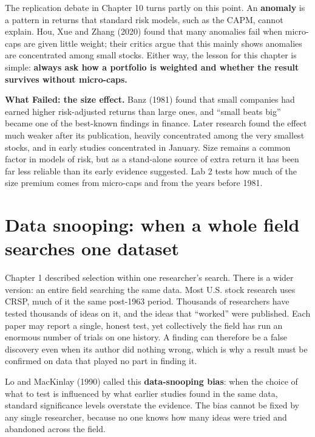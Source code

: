 The replication debate in Chapter 10 turns partly on this point. An \textbf{anomaly} is a pattern in returns that standard risk models, such as the CAPM, cannot explain. Hou, Xue and Zhang (2020) found that many anomalies fail when micro-caps are given little weight; their critics argue that this mainly shows anomalies are concentrated among small stocks. Either way, the lesson for this chapter is simple: \textbf{always ask how a portfolio is weighted and whether the result survives without micro-caps.}

\begin{callout}
\textbf{What Failed: the size effect.} Banz (1981) found that small companies had earned higher risk-adjusted returns than large ones, and ``small beats big'' became one of the best-known findings in finance. Later research found the effect much weaker after its publication, heavily concentrated among the very smallest stocks, and in early studies concentrated in January. Size remains a common factor in models of risk, but as a stand-alone source of extra return it has been far less reliable than its early evidence suggested. Lab 2 tests how much of the size premium comes from micro-caps and from the years before 1981.
\end{callout}

\section{Data snooping: when a whole field searches one dataset}
\label{sec:02-snooping}

Chapter 1 described selection within one researcher's search. There is a wider version: an entire field searching the same data. Most U.S. stock research uses CRSP, much of it the same post-1963 period. Thousands of researchers have tested thousands of ideas on it, and the ideas that ``worked'' were published. Each paper may report a single, honest test, yet collectively the field has run an enormous number of trials on one history. A finding can therefore be a false discovery even when its author did nothing wrong, which is why a result must be confirmed on data that played no part in finding it.

Lo and MacKinlay (1990) called this \textbf{data-snooping bias}: when the choice of what to test is influenced by what earlier studies found in the same data, standard significance levels overstate the evidence. The bias cannot be fixed by any single researcher, because no one knows how many ideas were tried and abandoned across the field.

